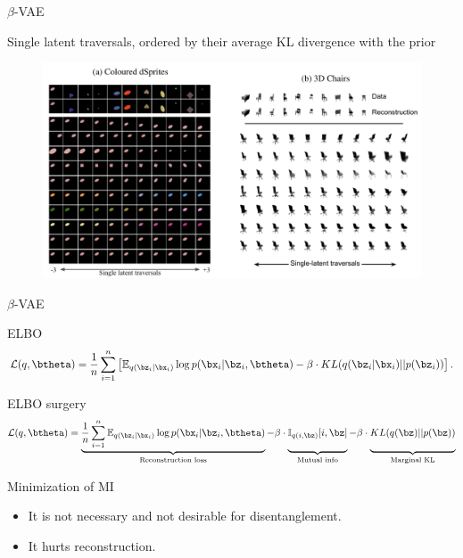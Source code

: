 \begin{frame}{$\beta$-VAE}
	\begin{block}{Single latent traversals, ordered by their average KL divergence with the prior}
		\begin{figure}
		\centering
		\includegraphics[width=\linewidth]{figs/betaVAE_9.png}
	\end{figure}
	\end{block}
\end{frame}
\begin{frame}{$\beta$-VAE}
	\begin{block}{ELBO}
		\vspace{-0.3cm}
		\[
		\mathcal{L}(q, \btheta) = \frac{1}{n} \sum_{i=1}^n \left[ \mathbb{E}_{q(\bz_i | \bx_i)} \log p(\bx_i | \bz_i, \btheta) - \beta \cdot KL(q(\bz_i | \bx_i) || p(\bz_i)) \right].
		\]
		\vspace{-0.3cm}
	\end{block}
	\begin{block}{ELBO surgery}
		\vspace{-0.3cm}
		{\footnotesize
			\[
			\mathcal{L}(q, \btheta) = \underbrace{\frac{1}{n} \sum_{i=1}^n \mathbb{E}_{q(\bz_i | \bx_i)} \log p(\bx_i | \bz_i, \btheta)}_{\text{Reconstruction loss}} - \beta \cdot \underbrace{\mathbb{I}_{q(i, \bz)} [i, \bz]\vphantom{\sum_{i=1}}}_{\text{Mutual info}} - \beta \cdot \underbrace{KL(q(\bz) || p(\bz))\vphantom{\sum_{i=1}}}_{\text{Marginal KL}}
			\]}
	\end{block}
	\begin{block}{Minimization of MI}
	\begin{itemize}
		\item It is not necessary and not desirable for disentanglement. 
		\item It hurts reconstruction.
	\end{itemize}
	\end{block}
\end{frame}
